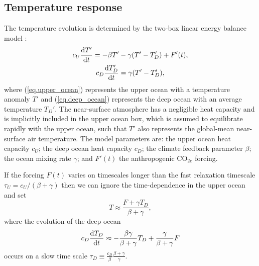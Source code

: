 \documentclass{article}
\begin{document}
\subsection{Temperature response}
The temperature evolution is determined by the two-box linear energy balance model \citep[e.g][]{gregory_vertical_2000, held_probing_2010}:
\begin{gather}
    c_{U} \dv{T'}{t} = -\beta T' - \gamma( T' - T_{D}') + F'(t), \label{eq.upper_ocean}
    \\
    c_{D} \dv{T_{D}'}{t} = \gamma (T' - T_{D}'),\label{eq.deep_ocean}
\end{gather}
where (\ref{eq.upper_ocean}) represents the upper ocean with a temperature anomaly $T'$ and (\ref{eq.deep_ocean}) represents the deep ocean with an average temperature $T_{D}'$. The near-surface atmosphere has a negligible heat capacity and is implicitly included in the upper ocean box, which is assumed to equilibrate rapidly with the upper ocean, such that $T'$ also represents the global-mean near-surface air temperature. The model parameters are: the upper ocean heat capacity $c_{U}$; the deep ocean heat capacity $c_{D}$; the climate feedback parameter $\beta$; the ocean mixing rate $\gamma$; and $F'(t)$ the anthropogenic CO$_{2e}$ forcing.

If the forcing $F(t)$ varies on timescales longer than the fast relaxation timescale $\tau_{U} = c_{U}/(\beta + \gamma)$ then we can ignore the time-dependence in the upper ocean and set
\begin{equation}
    T \approx \frac{F+\gamma T_{D}}{\beta + \gamma},
\end{equation}
where the evolution of the deep ocean
\begin{equation}
    c_{D} \dv{T_{D}}{t} \approx - \frac{\beta \gamma}{\beta + \gamma} T_{D} + \frac{\gamma}{\beta + \gamma} F
\end{equation}
occurs on a slow time scale $\tau_{D} \equiv \frac{c_{D}}{\beta} \frac{\beta + \gamma}{\gamma}$.

\end{document}
